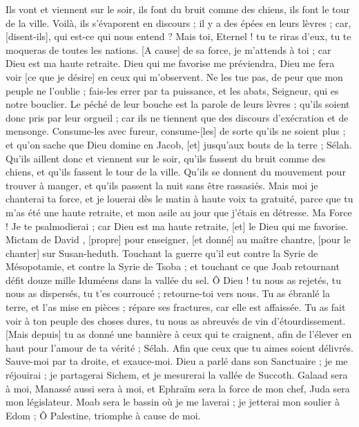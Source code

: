 \begin{multicols}{2}
Ils vont et viennent sur le soir, ils font du bruit comme des chiens, ils font le tour de la ville.
Voilà, ils s'évaporent en discours ; il y a des épées en leurs lèvres ; car, [disent-ils], qui est-ce qui nous entend ?
Mais toi, Eternel ! tu te riras d'eux, tu te moqueras de toutes les nations.
[A cause] de sa force, je m'attends à toi ; car Dieu est ma haute retraite.
Dieu qui me favorise me préviendra, Dieu me fera voir [ce que je désire] en ceux qui m'observent.
Ne les tue pas, de peur que mon peuple ne l'oublie ; fais-les errer par ta puissance, et les abats, Seigneur, qui es notre bouclier.
Le péché de leur bouche est la parole de leurs lèvres ; qu'ils soient donc pris par leur orgueil ; car ils ne tiennent que des discours d'exécration et de mensonge.
Consume-les avec fureur, consume-[les] de sorte qu'ils ne soient plus ; et qu'on sache que Dieu domine en Jacob, [et] jusqu'aux bouts de la terre ; Sélah.
Qu'ils aillent donc et viennent sur le soir, qu'ils fassent du bruit comme des chiens, et qu'ils fassent le tour de la ville.
Qu'ils se donnent du mouvement pour trouver à manger, et qu'ils passent la nuit sans être rassasiés.
Mais moi je chanterai ta force, et je louerai dès le matin à haute voix ta gratuité, parce que tu m'as été une haute retraite, et mon asile au jour que j'étais en détresse.
Ma Force ! Je te psalmodierai ; car Dieu est ma haute retraite, [et] le Dieu qui me favorise.
\VerseOne{}Mictam de David , [propre] pour enseigner, [et donné] au maître chantre, [pour le chanter] sur Susan-heduth. Touchant la guerre qu'il eut contre la Syrie de Mésopotamie, et contre la Syrie de Tsoba ; et touchant ce que Joab retournant défit douze mille Iduméens dans la vallée du sel. Ô Dieu ! tu nous as rejetés, tu nous as dispersés, tu t'es courroucé ; retourne-toi vers nous.
Tu as ébranlé la terre, et l'as mise en pièces ; répare ses fractures, car elle est affaissée.
Tu as fait voir à ton peuple des choses dures, tu nous as abreuvés de vin d'étourdissement.
[Mais depuis] tu as donné une bannière à ceux qui te craignent, afin de l'élever en haut pour l'amour de ta vérité ; Sélah.
Afin que ceux que tu aimes soient délivrés. Sauve-moi par ta droite, et exauce-moi.
Dieu a parlé dans son Sanctuaire ; je me réjouirai ; je partagerai Sichem, et je mesurerai la vallée de Succoth.
Galaad sera à moi, Manassé aussi sera à moi, et Ephraïm sera la force de mon chef, Juda sera mon législateur.
Moab sera le bassin où je me laverai ; je jetterai mon soulier à Edom ; Ô Palestine, triomphe à cause de moi.

\end{multicols}
